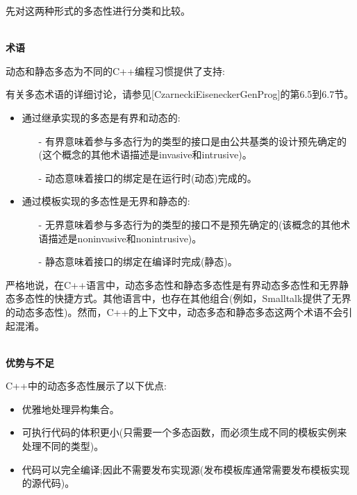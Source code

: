 
先对这两种形式的多态性进行分类和比较。

\hspace*{\fill} \\ %
\noindent
\textbf{术语}

动态和静态多态为不同的C++编程习惯提供了支持:

\begin{tcolorbox}[colback=webgreen!5!white,colframe=webgreen!75!black]
\hspace*{0.75cm}有关多态术语的详细讨论，请参见[CzarneckiEiseneckerGenProg]的第6.5到6.7节。
\end{tcolorbox}

\begin{itemize}
\item 
通过继承实现的多态是有界和动态的:

\begin{itemize}
\item[-]
有界意味着参与多态行为的类型的接口是由公共基类的设计预先确定的(这个概念的其他术语描述是invasive和intrusive)。

\item[-]
动态意味着接口的绑定是在运行时(动态)完成的。
\end{itemize}

\item 
通过模板实现的多态性是无界和静态的:

\begin{itemize}
\item[-]
无界意味着参与多态行为的类型的接口不是预先确定的(该概念的其他术语描述是noninvasive和nonintrusive)。

\item[-]
静态意味着接口的绑定在编译时完成(静态)。
\end{itemize}
\end{itemize}

严格地说，在C++语言中，动态多态性和静态多态性是有界动态多态性和无界静态多态性的快捷方式。其他语言中，也存在其他组合(例如，Smalltalk提供了无界的动态多态性)。然而，C++的上下文中，动态多态和静态多态这两个术语不会引起混淆。

\hspace*{\fill} \\ %
\noindent
\textbf{优势与不足}

C++中的动态多态性展示了以下优点:

\begin{itemize}
\item 
优雅地处理异构集合。

\item 
可执行代码的体积更小(只需要一个多态函数，而必须生成不同的模板实例来处理不同的类型)。

\item 
代码可以完全编译;因此不需要发布实现源(发布模板库通常需要发布模板实现的源代码)。
\end{itemize}

